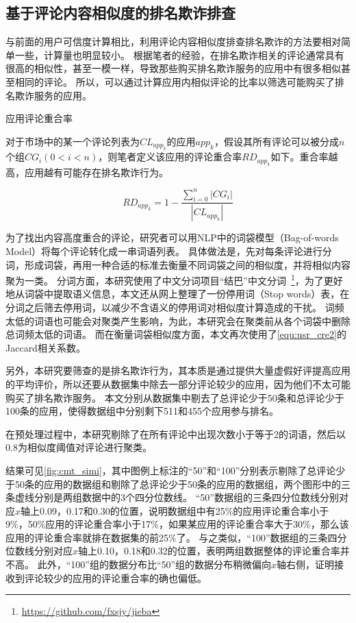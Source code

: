 \subsection{基于评论内容相似度的排名欺诈排查}
与前面的用户可信度计算相比，利用评论内容相似度排查排名欺诈的方法要相对简单一些，计算量也明显较小。
根据笔者的经验，在排名欺诈相关的评论通常具有很高的相似性，甚至一模一样，导致那些购买排名欺诈服务的应用中有很多相似甚至相同的评论。
所以，可以通过计算应用内相似评论的比率以筛选可能购买了排名欺诈服务的应用。

\begin{Def}
	应用评论重合率

	对于市场中的某一个评论列表为$CL_{app_k}$的应用$app_k$，假设其所有评论可以被分成$n$个组$CG_i (0 <i < n)$，则笔者定义该应用的评论重合率$RD_{app_k}$如下。重合率越高，应用越有可能存在排名欺诈行为。
\end{Def}

\begin{equation}
	RD_{app_k} = 1 - \frac{\sum_{i=0}^n|CG_i|}{|CL_{app_k}|}
	\label{equ:cmt_simi1}
\end{equation}
\vspace{0.5mm}

为了找出内容高度重合的评论，研究者可以用NLP中的词袋模型（Bag-of-words Model）将每个评论转化成一串词语列表。
具体做法是，先对每条评论进行分词，形成词袋，再用一种合适的标准去衡量不同词袋之间的相似度，并将相似内容聚为一类。
分词方面，本研究使用了中文分词项目“结巴”中文分词~\footnote{\url{https://github.com/fxsjy/jieba}}，为了更好地从词袋中提取语义信息，本文还从网上整理了一份停用词（Stop words）表，在分词之后筛去停用词，以减少不含语义的停用词对相似度计算造成的干扰。
词频太低的词语也可能会对聚类产生影响，为此，本研究会在聚类前从各个词袋中删除总词频太低的词语。
而在衡量词袋相似度方面，本文再次使用了\autoref{equ:usr_cre2}的Jaccard相关系数。

另外，本研究要筛查的是排名欺诈行为，其本质是通过提供大量虚假好评提高应用的平均评价，所以还要从数据集中除去一部分评论较少的应用，因为他们不太可能购买了排名欺诈服务。
本文分别从数据集中剔去了总评论少于50条和总评论少于100条的应用，使得数据组中分别剩下511和455个应用参与排名。

在预处理过程中，本研究剔除了在所有评论中出现次数小于等于2的词语，然后以0.8为相似度阈值对评论进行聚类。

结果可见\autoref{fig:cmt_simi}，其中图例上标注的``50''和``100''分别表示剔除了总评论少于50条的应用的数据组和剔除了总评论少于50条的应用的数据组，两个图形中的三条虚线分别是两组数据中的3个四分位数线。
``50''数据组的三条四分位数线分别对应$x$轴上0.09，0.17和0.30的位置，说明数据组中有25\%的应用评论重合率小于9\%，50\%应用的评论重合率小于17\%，如果某应用的评论重合率大于30\%，那么该应用的评论重合率就排在数据集的前25\%了。
与之类似，``100''数据组的三条四分位数线分别对应$x$轴上0.10，0.18和0.32的位置，表明两组数据整体的评论重合率并不高。
此外，``100''组的数据分布比``50''组的数据分布稍微偏向$x$轴右侧，证明接收到评论较少的应用的评论重合率的确也偏低。

